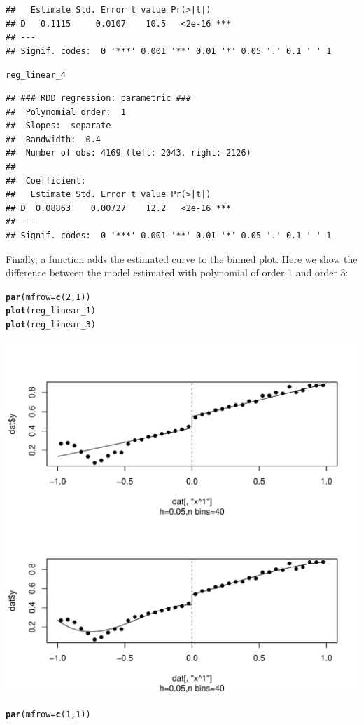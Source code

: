 \documentclass[english,nojss]{jss}\usepackage{graphicx, color}
\makeatletter
\def\maxwidth{ %
  \ifdim\Gin@nat@width>\linewidth
    \linewidth
  \else
    \Gin@nat@width
  \fi
}
\newcommand{\hlfunctioncall}[1]{\textcolor[rgb]{0.501960784313725,0,0.329411764705882}{\textbf{#1}}}%
\newenvironment{kframe}{%
 \def\at@end@of@kframe{}%
 \ifinner\ifhmode%
  \def\at@end@of@kframe{\end{minipage}}%
  \begin{minipage}{\columnwidth}%
 \fi\fi%
 \def\FrameCommand##1{\hskip\@totalleftmargin \hskip-\fboxsep
 \colorbox{shadecolor}{##1}\hskip-\fboxsep
     \hskip-\linewidth \hskip-\@totalleftmargin \hskip\columnwidth}%
 \MakeFramed {\advance\hsize-\width
   \@totalleftmargin\z@ \linewidth\hsize
   \@setminipage}}%
 {\par\unskip\endMakeFramed%
 \at@end@of@kframe}
\newenvironment{knitrout}{}{} %
\makeatother
\begin{document}
\begin{knitrout}
\begin{kframe}
\begin{verbatim}
##   Estimate Std. Error t value Pr(>|t|)    
## D   0.1115     0.0107    10.5   <2e-16 ***
## ---
## Signif. codes:  0 '***' 0.001 '**' 0.01 '*' 0.05 '.' 0.1 ' ' 1
\end{verbatim}
\begin{alltt}
reg_linear_4
\end{alltt}
\begin{verbatim}
## ### RDD regression: parametric ###
## 	Polynomial order:  1 
## 	Slopes:  separate 
## 	Bandwidth:  0.4 
## 	Number of obs: 4169 (left: 2043, right: 2126)
## 
## 	Coefficient:
##   Estimate Std. Error t value Pr(>|t|)    
## D  0.08863    0.00727    12.2   <2e-16 ***
## ---
## Signif. codes:  0 '***' 0.001 '**' 0.01 '*' 0.05 '.' 0.1 ' ' 1
\end{verbatim}
\end{kframe}
\end{knitrout}


Finally, a  function adds the estimated curve to the
binned plot. Here we show the difference between the model estimated
with polynomial of order 1 and order 3:

\begin{knitrout}
\color{fgcolor}\begin{kframe}
\begin{alltt}
\hlfunctioncall{par}(mfrow = \hlfunctioncall{c}(2, 1))
\hlfunctioncall{plot}(reg_linear_1)
\hlfunctioncall{plot}(reg_linear_3)
\end{alltt}
\end{kframe}
\includegraphics[width=\maxwidth]{figure/unnamed-chunk-9} 
\begin{kframe}\begin{alltt}
\hlfunctioncall{par}(mfrow = \hlfunctioncall{c}(1, 1))
\end{alltt}
\end{kframe}
\end{knitrout}
\end{document}
